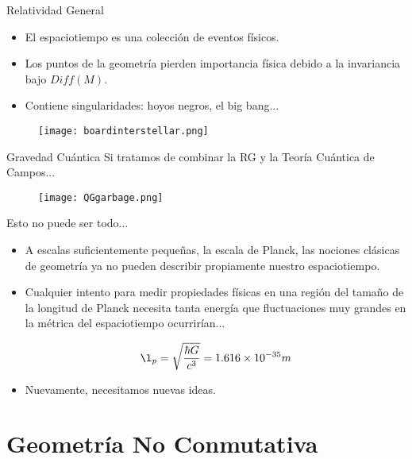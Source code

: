 \documentclass{beamer}
\begin{document}
\begin{frame}{Relatividad General}

 \begin{itemize}
  \item El espaciotiempo es una colección de eventos físicos.
\item
 Los puntos de la geometría pierden importancia física debido a la invariancia bajo $Diff(M)$.
  \item
  Contiene singularidades: hoyos negros, el big bang...


  \end{itemize}
  
\begin{figure}
\texttt{[image: boardinterstellar.png]}
\end{figure}
\end{frame}

\begin{frame}{Gravedad Cuántica}
Si tratamos de combinar la RG y la Teoría Cuántica de Campos... 
\begin{figure}
\texttt{[image: QGgarbage.png]}
\end{figure}

\end{frame}



\begin{frame}{Esto no puede ser todo...}
\begin{itemize}
\item A escalas suficientemente pequeñas, la escala de Planck, las nociones clásicas de geometría ya no pueden describir propiamente nuestro espaciotiempo. 
\item Cualquier intento para medir propiedades físicas en una región del tamaño de la longitud de Planck necesita tanta energía que fluctuaciones muy grandes en la métrica del espaciotiempo ocurrirían...
\begin{exampleblock}{}
\[
\l_{p} = \sqrt{\frac{\hbar G}{c^3}} = 1.616 \times 10^{-35} m
\]
\end{exampleblock}
\pause
\item Nuevamente, necesitamos nuevas ideas.
\end{itemize}
\end{frame}


\section{Geometría No Conmutativa}
\end{document}
